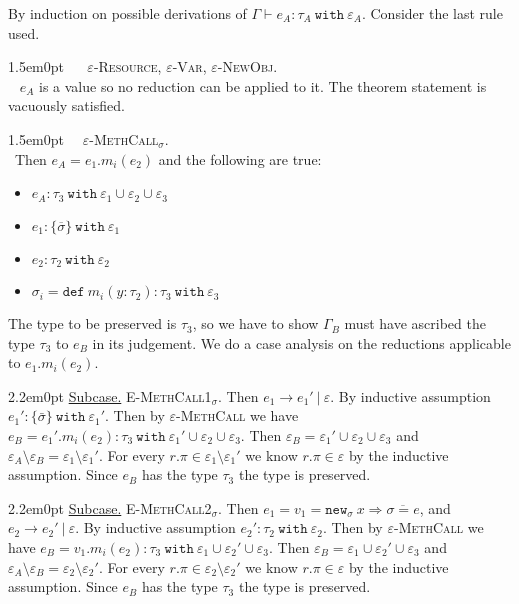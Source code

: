 \documentclass{llncs}
\newcommand{\keywadj}[1]{\mathtt{#1}}
\newcommand{\keyw}[1]{\keywadj{#1}~}
\newcommand{\proofcase}[2]{
	\begin{adjustwidth}{1.5em}{0pt}
		\fbox{Case.}~~#1. \\ ~#2
	\end{adjustwidth}
}
\newcommand{\subcase}[1] {
	\begin{adjustwidth}{2.2em}{0pt}
		\underline{Subcase.} #1
	\end{adjustwidth}
}
\newcommand{\newsig}[0]{
	\keywadj{new}_\sigma~x \Rightarrow \overline{\sigma = e}
}
\begin{document}
{By induction on possible derivations of $\Gamma \vdash e_A : \tau_A~\keyw{with} \varepsilon_A$. Consider the last rule used.\\

	\proofcase{ \textsc{$\varepsilon$-Resource}, \textsc{$\varepsilon$-Var}, \textsc{$\varepsilon$-NewObj}} {
		$e_A$ is a value so no reduction can be applied to it. The theorem statement is vacuously satisfied.\\ }
	
	\proofcase{\textsc{$\varepsilon$-MethCall$_{\sigma}$}}
	{Then $e_A = e_1.m_i(e_2)$ and the following are true:
\begin{itemize}
	\item $e_A : \tau_3~\keyw{with} \varepsilon_1 \cup \varepsilon_2 \cup \varepsilon_3$
	\item $e_1  : \{ \overline \sigma \}~ \keyw{with} \varepsilon_1$
	\item $e_2 : \tau_2~\keyw{with} \varepsilon_2$
	\item $\sigma_i = \keyw{def} m_i(y : \tau_2) : \tau_3~ \keyw{with} \varepsilon_3$
\end{itemize}
The type to be preserved is $\tau_3$, so we have to show $\Gamma_B$ must have ascribed the type $\tau_3$ to $e_B$ in its judgement. We do a case analysis on the reductions applicable to $e_1.m_i(e_2)$.

		\subcase{ \textsc{E-MethCall1$_\sigma$.} Then $e_1 \longrightarrow e_1'~|~\varepsilon$. By inductive assumption $e_1' : \{ \bar \sigma \}~\keyw{with} \varepsilon_1'$. Then by \textsc{$\varepsilon$-MethCall} we have $e_B = e_1'.m_i(e_2) : \tau_3~\keyw{with} \varepsilon_1' \cup \varepsilon_2 \cup \varepsilon_3$. Then $\varepsilon_B = \varepsilon_1' \cup \varepsilon_2 \cup \varepsilon_3$ and $\varepsilon_A \setminus \varepsilon_B = \varepsilon_1 \setminus \varepsilon_1'$. For every $r.\pi \in \varepsilon_1 \setminus \varepsilon_1'$ we know $r.\pi \in \varepsilon$ by the inductive assumption. Since $e_B$ has the type $\tau_3$ the type is preserved.}
		
		\subcase{ \textsc{E-MethCall2$_\sigma$.} 	Then $e_1 = v_1 = \newsig$, and $e_2 \longrightarrow e_2'~|~\varepsilon$. By inductive assumption $e_2' : \tau_2~\keyw{with} \varepsilon_2$. Then by \textsc{$\varepsilon$-MethCall} we have $e_B = v_1.m_i(e_2) : \tau_3~\keyw{with} \varepsilon_1 \cup \varepsilon_2' \cup \varepsilon_3$. Then $\varepsilon_B = \varepsilon_1 \cup \varepsilon_2' \cup \varepsilon_3$ and $\varepsilon_A \setminus \varepsilon_B = \varepsilon_2 \setminus \varepsilon_2'$. For every $r.\pi \in \varepsilon_2 \setminus \varepsilon_2'$ we know $r.\pi \in \varepsilon$ by the inductive assumption. Since $e_B$ has the type $\tau_3$ the type is preserved.}
		
}}
\end{document}
